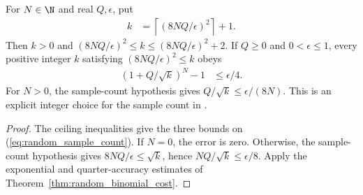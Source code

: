 \begin{theorem}
    \label{thm:random_sample_count}
    \leanok
    For $N\in\N$ and real $Q,\epsilon$, put
    \begin{align}
        k & =\left\lceil(8NQ/\epsilon)^2\right\rceil+1.
        \label{eq:random_sample_count}
    \end{align}
    Then $k>0$ and
    $(8NQ/\epsilon)^2\leq k\leq(8NQ/\epsilon)^2+2$.
    If $Q\geq0$ and $0<\epsilon\leq1$, every positive integer $k$ satisfying
    $(8NQ/\epsilon)^2\leq k$ obeys
    \begin{align}
        (1+Q/\sqrt{k})^N-1 & \leq\epsilon/4.
        \label{eq:random_quarter_accuracy}
    \end{align}
    For $N>0$, the sample-count hypothesis gives
    $Q/\sqrt{k}\leq\epsilon/(8N)$.
    This is an explicit integer choice for the sample count in
    \cite[Theorem~5.2, paragraph following Equation~(5.19)]{OpenAI2026PolynomialPEPS}.
\end{theorem}

\begin{proof}\leanok
    The ceiling inequalities give the three bounds on
    (\ref{eq:random_sample_count}). If $N=0$, the error is zero.
    Otherwise, the sample-count hypothesis gives
    $8NQ/\epsilon\leq\sqrt{k}$, hence $NQ/\sqrt{k}\leq\epsilon/8$.
    Apply the exponential and quarter-accuracy estimates of
    Theorem~\ref{thm:random_binomial_cost}.
\end{proof}

